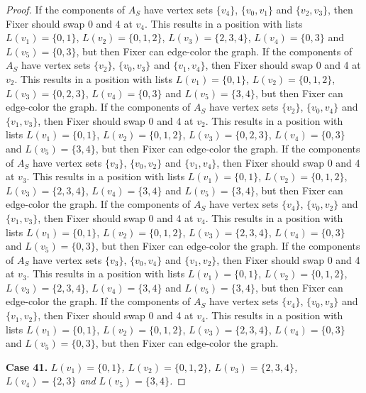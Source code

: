 \documentclass[12pt]{amsart}
\theoremstyle{plain}
\theoremstyle{definition}
\theoremstyle{remark}
\begin{document}
\begin{proof}
If the components of $A_S$ have vertex sets $\{v_4\}$, $\{v_0, v_1\}$ and $\{v_2, v_3\}$, then Fixer should swap 0 and 4 at $v_4$. This results in a position with lists $L(v_1) = \{0, 1\}$, $L(v_2) = \{0, 1, 2\}$, $L(v_3) = \{2, 3, 4\}$, $L(v_4) = \{0, 3\}$ and $L(v_5) = \{0, 3\}$, but then Fixer can edge-color the graph.
If the components of $A_S$ have vertex sets $\{v_2\}$, $\{v_0, v_3\}$ and $\{v_1, v_4\}$, then Fixer should swap 0 and 4 at $v_2$. This results in a position with lists $L(v_1) = \{0, 1\}$, $L(v_2) = \{0, 1, 2\}$, $L(v_3) = \{0, 2, 3\}$, $L(v_4) = \{0, 3\}$ and $L(v_5) = \{3, 4\}$, but then Fixer can edge-color the graph.
If the components of $A_S$ have vertex sets $\{v_2\}$, $\{v_0, v_4\}$ and $\{v_1, v_3\}$, then Fixer should swap 0 and 4 at $v_2$. This results in a position with lists $L(v_1) = \{0, 1\}$, $L(v_2) = \{0, 1, 2\}$, $L(v_3) = \{0, 2, 3\}$, $L(v_4) = \{0, 3\}$ and $L(v_5) = \{3, 4\}$, but then Fixer can edge-color the graph.
If the components of $A_S$ have vertex sets $\{v_3\}$, $\{v_0, v_2\}$ and $\{v_1, v_4\}$, then Fixer should swap 0 and 4 at $v_3$. This results in a position with lists $L(v_1) = \{0, 1\}$, $L(v_2) = \{0, 1, 2\}$, $L(v_3) = \{2, 3, 4\}$, $L(v_4) = \{3, 4\}$ and $L(v_5) = \{3, 4\}$, but then Fixer can edge-color the graph.
If the components of $A_S$ have vertex sets $\{v_4\}$, $\{v_0, v_2\}$ and $\{v_1, v_3\}$, then Fixer should swap 0 and 4 at $v_4$. This results in a position with lists $L(v_1) = \{0, 1\}$, $L(v_2) = \{0, 1, 2\}$, $L(v_3) = \{2, 3, 4\}$, $L(v_4) = \{0, 3\}$ and $L(v_5) = \{0, 3\}$, but then Fixer can edge-color the graph.
If the components of $A_S$ have vertex sets $\{v_3\}$, $\{v_0, v_4\}$ and $\{v_1, v_2\}$, then Fixer should swap 0 and 4 at $v_3$. This results in a position with lists $L(v_1) = \{0, 1\}$, $L(v_2) = \{0, 1, 2\}$, $L(v_3) = \{2, 3, 4\}$, $L(v_4) = \{3, 4\}$ and $L(v_5) = \{3, 4\}$, but then Fixer can edge-color the graph.
If the components of $A_S$ have vertex sets $\{v_4\}$, $\{v_0, v_3\}$ and $\{v_1, v_2\}$, then Fixer should swap 0 and 4 at $v_4$. This results in a position with lists $L(v_1) = \{0, 1\}$, $L(v_2) = \{0, 1, 2\}$, $L(v_3) = \{2, 3, 4\}$, $L(v_4) = \{0, 3\}$ and $L(v_5) = \{0, 3\}$, but then Fixer can edge-color the graph.

\noindent\textbf{Case 41.  }\textit{$L(v_1) = \{0, 1\}$, $L(v_2) = \{0, 1, 2\}$, $L(v_3) = \{2, 3, 4\}$, $L(v_4) = \{2, 3\}$ and $L(v_5) = \{3, 4\}$.}


\end{proof}
\end{document}
